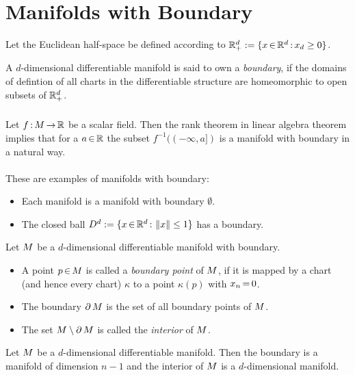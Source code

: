 \documentclass[11pt,twoside]{article}
\begin{document}
\section{Manifolds with Boundary}
Let the Euclidean half-space be defined according to
${\mathbb{R}}^d_+ := \{x {\,\in\,} {\mathbb{R}}^d {\,:\,} x_d \geq 0\}$.

\begin{definition}
A $d$-dimensional differentiable manifold is said to own a \textit{boundary},
if the domains of defintion of all charts in the differentiable structure
are homeomorphic to open subsets of ${\mathbb{R}}^d_+$.
\end{definition}

\subparagraph{}
Let $f{\,:\,}{M} {\,\to\,} {\mathbb{R}}$ be a scalar field.
Then the rank theorem in linear algebra theorem implies
that for a $a {\,\in\,} {\mathbb{R}}$ the subset $f^{-1}((- \infty, a])$
is a manifold with boundary in a natural way.

\paragraph{}
These are examples of manifolds with boundary:

\begin{itemize}[leftmargin=15pt]
\item[1.]
Each manifold is a manifold with boundary $\emptyset$.
\item[2.]
The closed ball $D^d := \{x {\,\in\,} {\mathbb{R}}^d {\,:\,} \left\lVert x \right\rVert \leq 1\}$ has a boundary.
\end{itemize}

\begin{definition}
Let ${M}$ be a $d$-dimensional differentiable manifold with boundary.
\begin{itemize}[leftmargin=15pt]
\item[1.]
A point $p {\,\in\,} {M}$ is called a \textit{boundary point} of ${M}$,
if it is mapped by a chart (and hence every chart) $\kappa$
to a point $\kappa(p)$ with $x_n {\,=\,} 0$.
\item[2.]
The boundary $\partial \, {M}$ is the set of all boundary points of ${M}$.
\item[3.]
The set ${M} \setminus \partial \, {M}$ is called the \textit{interior}
of ${M}$.
\end{itemize}
\end{definition}

\begin{theorem}
Let ${M}$ be a $d$-dimensional differentiable manifold.
Then the boundary is a manifold of dimension $n-1$
and the interior of ${M}$ is a $d$-dimensional manifold.
\end{theorem}
\end{document}
